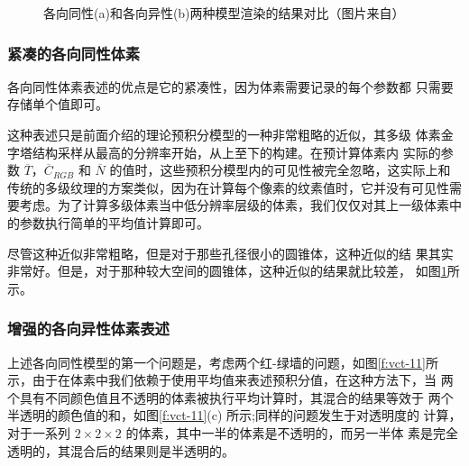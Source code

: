 \begin{figure}
\begin{subfigure}[b]{0.5\textwidth}
		\caption{}
	\end{subfigure}
	\caption{各向同性(a)和各向异性(b)两种模型渲染的结果对比（图片来自\cite{a:InteractiveIndirectIlluminationUsingVoxelConeTracing}）}
	\label{f:vct-12}
\end{figure}


\subsubsection{紧凑的各向同性体素}
各向同性体素表述的优点是它的紧凑性，因为体素需要记录的每个参数都 只需要存储单个值即可。

这种表述只是前面介绍的理论预积分模型的一种非常粗略的近似，其多级 体素金字塔结构采样从最高的分辨率开始，从上至下的构建。在预计算体素内 实际的参数 $\overline{T}$，$\overline{C}_{RGB}$ 和 $\overline{N}$ 的值时，这些预积分模型内的可见性被完全忽略，这实际上和传统的多级纹理的方案类似，因为在计算每个像素的纹素值时，它并没有可见性需要考虑。为了计算多级体素当中低分辨率层级的体素，我们仅仅对其上一级体素中的参数执行简单的平均值计算即可。

尽管这种近似非常粗略，但是对于那些孔径很小的圆锥体，这种近似的结 果其实非常好。但是，对于那种较大空间的圆锥体，这种近似的结果就比较差， 如图\ref{f:vct-12}所示。




\subsubsection{增强的各向异性体素表述}
上述各向同性模型的第一个问题是，考虑两个红-绿墙的问题，如图\ref{f:vct-11}所 示，由于在体素中我们依赖于使用平均值来表述预积分值，在这种方法下，当 两个具有不同颜色值且不透明的体素被执行平均计算时，其混合的结果等效于 两个半透明的颜色值的和，如图\ref{f:vct-11}(c) 所示;同样的问题发生于对透明度的 计算，对于一系列 $2\times 2\times 2$ 的体素，其中一半的体素是不透明的，而另一半体 素是完全透明的，其混合后的结果则是半透明的。

